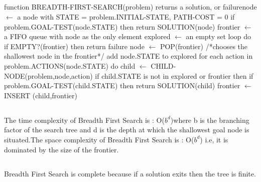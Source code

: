 \documentclass[
10pt, %
a4paper, %
oneside, %
headinclude,footinclude, %
BCOR5mm, %
]{scrartcl}
\newcommand\tab[1][1cm]{\hspace*{#1}}
\begin{document}
\subsection*{}
function BREADTH-FIRST-SEARCH(problem) returns a solution, or failure\newline\newline node $\leftarrow$ a node with STATE = problem.INITIAL-STATE, PATH-COST = 0\newline
if problem.GOAL-TEST(node.STATE) then return SOLUTION(node)\newline
frontier $\leftarrow$ a FIFO queue with node as the only element\newline
explored $\leftarrow$ an empty set\newline
loop do\newline
\tab if EMPTY?(frontier) then return failure\newline
\tab node $\leftarrow$ POP(frontier) /*chooses the shallowest node in the frontier*/\newline
\tab add node.STATE to explored\newline
\tab for each action in problem.ACTIONS(node.STATE) do\newline
\tab\tab child $\leftarrow$ CHILD-NODE(problem,node,action)\newline
\tab\tab if child.STATE is not in explored or frontier then\newline
\tab\tab\tab if problem.GOAL-TEST(child.STATE) then return SOLUTION(child)\newline
\tab\tab\tab frontier $\leftarrow$ INSERT (child,frontier)\newline

\subsection*{}
The time complexity of Breadth First Search is : O($b^d$)\newline where b is the branching factor of the search tree and d is the depth at which the shallowest goal node is situated.\newline The space complexity of Breadth First Search is : O($b^d$) i.e, it is dominated by the size of the frontier.

\subsection*{}
Breadth First Search is complete because if a solution exits then the tree is finite.
\end{document}
